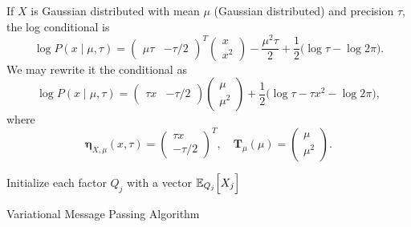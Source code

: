 \begin{exampleth}
    If \( X \) is Gaussian distributed with mean \( \mu \) (Gaussian distributed) and precision \(\tau\),  the log conditional is
    \[
         \log P(x \mid \mu, \tau) =
         \begin{pmatrix}
             \mu \tau & -\tau/2
         \end{pmatrix}^T
         \begin{pmatrix}
             x\\
             x^2
         \end{pmatrix}
         - \frac{\mu^{2}\tau}{2} + \frac{1}{2}\big( \log \tau - \log 2\pi \big).
    \]
    We may rewrite it the conditional as
    \[
         \log  P(x \mid \mu, \tau) =
         \begin{pmatrix}
             \tau x & -\tau/2
         \end{pmatrix}
         \begin{pmatrix}
             \mu\\
             \mu^2
         \end{pmatrix}
         + \frac{1}{2}\big( \log \tau - \tau x^2 - \log 2\pi \big),
    \]
    where
    \[
         \bm{\eta}_{X,\mu}(x,\tau) =  \begin{pmatrix}
            \tau x\\
            -\tau/2
        \end{pmatrix}^T,\quad \bm{T}_\mu(\mu)=  \begin{pmatrix}
            \mu\\
            \mu^2
        \end{pmatrix}.
    \]
\end{exampleth}



\begin{algorithm}[t]
  \SetAlgoLined{}
  Initialize each factor \(Q_{j}\) with a vector \(\mathbb{E}_{Q_{j}}\Big[X_{j}\Big]\)\;
  \;
  \caption{Variational Message Passing Algorithm}\label{alg:vmp}
\end{algorithm}


